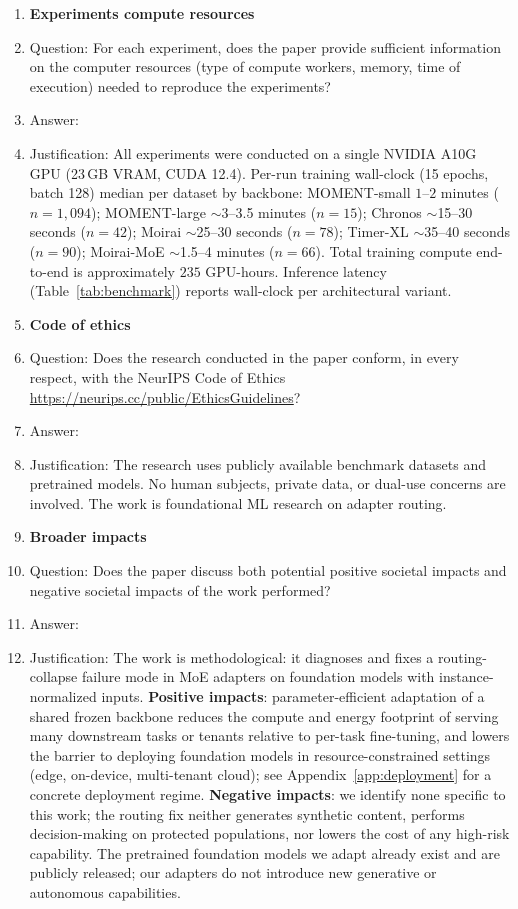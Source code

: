 \begin{enumerate}
\item {\bf Experiments compute resources}
    \item[] Question: For each experiment, does the paper provide sufficient information on the computer resources (type of compute workers, memory, time of execution) needed to reproduce the experiments?
    \item[] Answer: \answerYes{}
    \item[] Justification: All experiments were conducted on a single NVIDIA A10G GPU (23\,GB VRAM, CUDA 12.4). Per-run training wall-clock (15 epochs, batch 128) median per dataset by backbone: MOMENT-small $1$--$2$ minutes ($n{=}1{,}094$); MOMENT-large $\sim$3--3.5 minutes ($n{=}15$); Chronos $\sim$15--30 seconds ($n{=}42$); Moirai $\sim$25--30 seconds ($n{=}78$); Timer-XL $\sim$35--40 seconds ($n{=}90$); Moirai-MoE $\sim$1.5--4 minutes ($n{=}66$). Total training compute end-to-end is approximately $235$ GPU-hours. Inference latency (Table~\ref{tab:benchmark}) reports wall-clock per architectural variant.

\item {\bf Code of ethics}
    \item[] Question: Does the research conducted in the paper conform, in every respect, with the NeurIPS Code of Ethics \url{https://neurips.cc/public/EthicsGuidelines}?
    \item[] Answer: \answerYes{}
    \item[] Justification: The research uses publicly available benchmark datasets and pretrained models. No human subjects, private data, or dual-use concerns are involved. The work is foundational ML research on adapter routing.

\item {\bf Broader impacts}
    \item[] Question: Does the paper discuss both potential positive societal impacts and negative societal impacts of the work performed?
    \item[] Answer: \answerYes{}
    \item[] Justification: The work is methodological: it diagnoses and fixes a routing-collapse failure mode in MoE adapters on foundation models with instance-normalized inputs. \textbf{Positive impacts}: parameter-efficient adaptation of a shared frozen backbone reduces the compute and energy footprint of serving many downstream tasks or tenants relative to per-task fine-tuning, and lowers the barrier to deploying foundation models in resource-constrained settings (edge, on-device, multi-tenant cloud); see Appendix~\ref{app:deployment} for a concrete deployment regime. \textbf{Negative impacts}: we identify none specific to this work; the routing fix neither generates synthetic content, performs decision-making on protected populations, nor lowers the cost of any high-risk capability. The pretrained foundation models we adapt already exist and are publicly released; our adapters do not introduce new generative or autonomous capabilities.


\end{enumerate}
